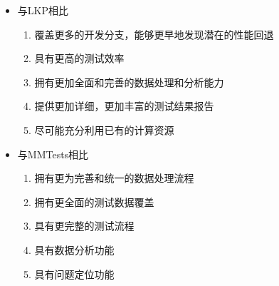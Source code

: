 \begin{itemize}
\item 与LKP相比

\begin{enumerate}
\item 覆盖更多的开发分支，能够更早地发现潜在的性能回退
\item 具有更高的测试效率
\item 拥有更加全面和完善的数据处理和分析能力
\item 提供更加详细，更加丰富的测试结果报告
\item 尽可能充分利用已有的计算资源
\end{enumerate}

\item 与MMTests相比

\begin{enumerate}
\item 拥有更为完善和统一的数据处理流程
\item 拥有更全面的测试数据覆盖
\item 具有更完整的测试流程
\item 具有数据分析功能
\item 具有问题定位功能
\end{enumerate}

\end{itemize}